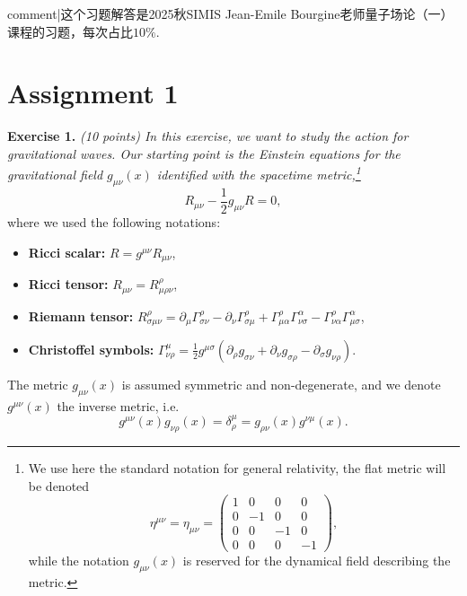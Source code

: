 
{{comment|这个习题解答是2025秋SIMIS Jean-Emile Bourgine老师量子场论（一）课程的习题，每次占比$10\%$.}}


\section{Assignment 1}

\textbf{Exercise 1.} \textit{(10 points) In this exercise, we want to study the action for gravitational waves. Our starting point is the Einstein equations for the gravitational field $g_{\mu\nu}(x)$ identified with the spacetime metric,\footnote{We use here the standard notation for general relativity, the flat metric will be denoted
\begin{equation}
    \eta^{\mu\nu} = \eta_{\mu\nu} = \begin{pmatrix}
    1 & 0 & 0 & 0 \\
    0 & -1 & 0 & 0 \\
    0 & 0 & -1 & 0 \\
    0 & 0 & 0 & -1
    \end{pmatrix},
\end{equation}
while the notation $g_{\mu\nu}(x)$ is reserved for the dynamical field describing the metric.}}
\begin{equation}
    R_{\mu\nu} - \frac{1}{2}g_{\mu\nu}R = 0,
\end{equation}
where we used the following notations:
\begin{itemize}
    \item \textbf{Ricci scalar:} $R = g^{\mu\nu}R_{\mu\nu}$,
    \item \textbf{Ricci tensor:} $R_{\mu\nu} = R^\rho_{\mu\rho\nu}$,
    \item \textbf{Riemann tensor:} $R^\rho_{\sigma\mu\nu} = \partial_\mu \Gamma^\rho_{\sigma\nu} - \partial_\nu \Gamma^\rho_{\sigma\mu} + \Gamma^\rho_{\mu\alpha}\Gamma^\alpha_{\nu\sigma} - \Gamma^\rho_{\nu\alpha}\Gamma^\alpha_{\mu\sigma}$,
    \item \textbf{Christoffel symbols:} $\Gamma^\mu_{\nu\rho} = \frac{1}{2}g^{\mu\sigma}(\partial_\rho g_{\sigma\nu} + \partial_\nu g_{\sigma\rho} - \partial_\sigma g_{\nu\rho})$.
\end{itemize}
The metric $g_{\mu\nu}(x)$ is assumed symmetric and non-degenerate, and we denote $g^{\mu\nu}(x)$ the inverse metric, i.e.
\begin{equation}
    g^{\mu\nu}(x)g_{\nu\rho}(x) = \delta^\mu_\rho = g_{\rho\nu}(x)g^{\nu\mu}(x).
\end{equation}

